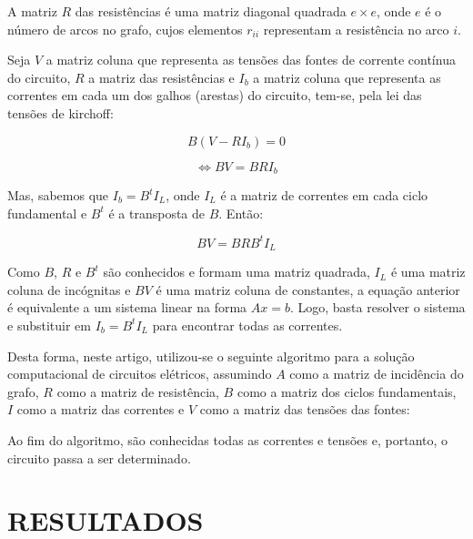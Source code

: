 \documentclass[twocolumn, 10pt]{extarticle}
\begin{document}
A matriz $R$ das resistências é uma matriz diagonal quadrada $e \times e$, onde $e$ é o número de arcos no grafo, cujos elementos $r_{ii}$ representam a resistência no arco $i$.

Seja $V$ a matriz coluna que representa as tensões das fontes de corrente contínua do circuito, $R$ a matriz das resistências e $I_b$ a matriz coluna que representa as correntes em cada um dos galhos (arestas) do circuito, tem-se, pela lei das tensões de kirchoff:

\[
B(V -RI_b) = 0
\]

\[
\iff 
 BV = BRI_b  
\]

Mas, sabemos que $I_b = B^tI_L$, onde $I_L$ é a matriz de correntes em cada ciclo fundamental e $B^t$ é a transposta de $B$. Então:

\[
BV = BRB^tI_L
\]

Como $B$, $R$ e $B^t$ são conhecidos e formam uma matriz quadrada, $I_L$ é uma matriz coluna de incógnitas e $BV$ é uma matriz coluna de constantes, a equação anterior é equivalente a um sistema linear na forma $Ax = b$. Logo, basta resolver o sistema e substituir em $I_b = B^tI_L$ para encontrar todas as correntes.

Desta forma, neste artigo, utilizou-se o seguinte algoritmo para a solução computacional de circuitos elétricos, assumindo $A$ como a matriz de incidência do grafo, $R$ como a matriz de resistência, $B$ como a matriz dos ciclos fundamentais, $I$ como a matriz das correntes e $V$ como a matriz das tensões das fontes:

\begingroup
{}\label{cs}
\begin{algorithmic}[1]
	\Else
	\EndIf
\EndFunction
\end{algorithmic}
\hrulefill
\endgroup

Ao fim do algoritmo, são conhecidas todas as correntes e tensões e, portanto, o circuito passa a ser determinado.


\section{RESULTADOS}
\end{document}

